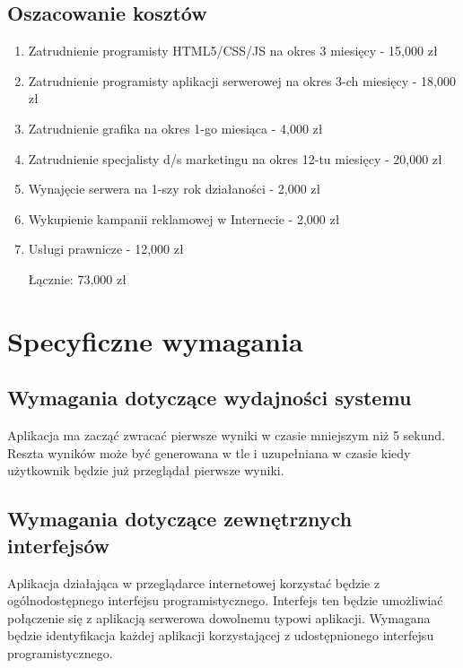 \documentclass[12pt,a4paper]{report}
\begin{document}
\subsection{Oszacowanie kosztów}
\begin{enumerate}
	\item Zatrudnienie programisty HTML5/CSS/JS na okres 3 miesięcy - 15,000 zł
	\item Zatrudnienie programisty aplikacji serwerowej na okres 3-ch miesięcy - 18,000 zł
	\item Zatrudnienie grafika na okres 1-go miesiąca - 4,000 zł
	\item Zatrudnienie specjalisty d/s marketingu na okres 12-tu miesięcy - 20,000 zł
	\item Wynajęcie serwera na 1-szy rok działaności - 2,000 zł
	\item Wykupienie kampanii reklamowej w Internecie - 2,000 zł
	\item Usługi prawnicze - 12,000 zł

Łącznie: 73,000 zł
\end{enumerate}
\newpage
\section{Specyficzne wymagania}
\subsection{Wymagania dotyczące wydajności systemu}
	Aplikacja ma zacząć zwracać pierwsze wyniki w czasie mniejszym niż 5 sekund. Reszta wyników może być generowana w tle i uzupełniana w czasie kiedy użytkownik będzie już przeglądał pierwsze wyniki.
\subsection{Wymagania dotyczące zewnętrznych interfejsów}
Aplikacja działająca w przeglądarce internetowej korzystać będzie z ogólnodostępnego interfejsu programistycznego. Interfejs ten będzie umożliwiać połączenie się z aplikacją serwerowa dowolnemu typowi aplikacji. Wymagana będzie identyfikacja każdej aplikacji korzystającej z udostępnionego interfejsu programistycznego.
\end{document}
